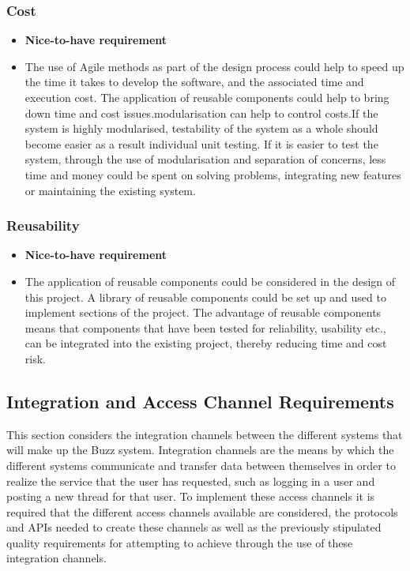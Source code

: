\documentclass[a4paper]{article}
\begin{document}
\subsubsection{Cost}
\begin{itemize}
	\item \textbf{Nice-to-have requirement}
	\item The use of Agile methods as part of the design process could help to speed up the time it takes to develop the software, and the associated time and execution cost. The application of reusable components could help to bring down time and cost issues.modularisation can help to control costs.If the system is highly modularised, testability of the system as a whole should become easier as a result individual unit testing. If it is easier to test the system, through the use of modularisation and separation of concerns, less time and money could be spent on solving problems, integrating new features or maintaining the existing system.
\end{itemize}   

\subsubsection{Reusability }
\begin{itemize}
	\item \textbf{Nice-to-have requirement}
	\item The application of reusable components could be considered in the design of this project. A library of reusable components could be set up and used to implement sections of the project. The advantage of reusable components means that components that have been tested for reliability, usability etc., can be integrated into the existing project, thereby reducing time and cost risk.
\end{itemize} 

\subsection{Integration and Access Channel Requirements}
This section considers the integration channels between the different systems that will make up the Buzz system. Integration channels are the means by which the different systems communicate and transfer data between themselves in order to realize the service that the user has requested, such as logging in a user and posting a new thread for that user. To implement these
access channels it is required that the different access channels available are considered, the protocols and APIs needed to create these channels as well as the previously stipulated quality requirements for attempting to achieve through the use of these integration channels.
\end{document}
